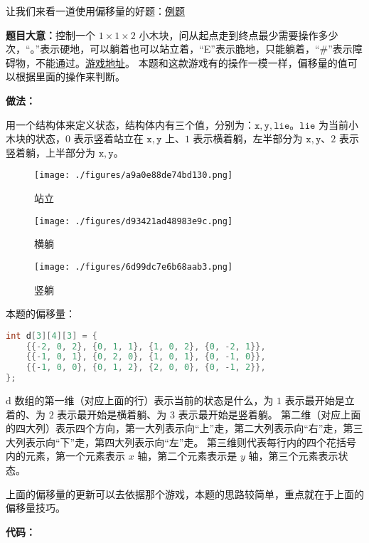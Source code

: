 让我们来看一道使用偏移量的好题：\href{http://poj.org/problem?id=3322}{例题}

\textbf{题目大意：}控制一个 $1 \times 1 \times 2$ 小木块，问从起点走到终点最少需要操作多少次，“。”表示硬地，可以躺着也可以站立着，“E”表示脆地，只能躺着，“\#”表示障碍物，不能通过。\href{https://www.4399.com/flash/6860_3.htm}{游戏地址}。
本题和这款游戏有的操作一模一样，偏移量的值可以根据里面的操作来判断。

\textbf{做法：}

用一个结构体来定义状态，结构体内有三个值，分别为：$\mathtt{x, y, lie}$。$\mathtt{lie}$ 为当前小木块的状态，$0$ 表示竖着站立在 $\mathtt{x, y}$ 上、$1$ 表示横着躺，左半部分为 $\mathtt{x, y}$、$2$ 表示竖着躺，上半部分为 $\mathtt{x, y}$。

\begin{figure}[ht]
\centering
\texttt{[image: ./figures/a9a0e88de74bd130.png]}
\caption{站立} \label{fig_BFS_4}
\end{figure}
\begin{figure}[ht]
\centering
\texttt{[image: ./figures/d93421ad48983e9c.png]}
\caption{横躺} \label{fig_BFS_5}
\end{figure}
\begin{figure}[ht]
\centering
\texttt{[image: ./figures/6d99dc7e6b68aab3.png]}
\caption{竖躺} \label{fig_BFS_6}
\end{figure}


本题的偏移量：
\begin{lstlisting}[language=cpp]
int d[3][4][3] = {
    {{-2, 0, 2}, {0, 1, 1}, {1, 0, 2}, {0, -2, 1}},  
    {{-1, 0, 1}, {0, 2, 0}, {1, 0, 1}, {0, -1, 0}},  
    {{-1, 0, 0}, {0, 1, 2}, {2, 0, 0}, {0, -1, 2}},  
};
\end{lstlisting}

d 数组的第一维（对应上面的行）表示当前的状态是什么，为 $1$ 表示最开始是立着的、为 $2$ 表示最开始是横着躺、为 $3$ 表示最开始是竖着躺。
第二维（对应上面的四大列）表示四个方向，第一大列表示向“上”走，第二大列表示向“右”走，第三大列表示向“下”走，第四大列表示向“左”走。
第三维则代表每行内的四个花括号内的元素，第一个元素表示 $x$ 轴，第二个元素表示是 $y$ 轴，第三个元素表示状态。

上面的偏移量的更新可以去依据那个游戏，本题的思路较简单，重点就在于上面的偏移量技巧。


\textbf{代码：}

